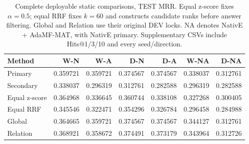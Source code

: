 \begin{table}[htbp]
\centering\footnotesize
\setlength{\tabcolsep}{4pt}
\caption{Complete deployable static comparisons, TEST MRR. Equal z-score fixes $\alpha=0.5$; equal RRF fixes $k=60$ and constructs candidate ranks before answer filtering. Global and Relation use their original DEV locks. NA denotes NativE + AdaMF-MAT, with NativE primary. Supplementary CSVs include Hits@1/3/10 and every seed/direction.}
\label{tab:matched-static}
\begin{tabular}{lrrrrrr}
\toprule
Method & W-N & W-A & D-N & D-A & W-NA & D-NA\\
\midrule
Primary & 0.359721 & 0.359721 & 0.374567 & 0.374567 & 0.338037 & 0.312761\\
Secondary & 0.338037 & 0.296319 & 0.312761 & 0.282588 & 0.296319 & 0.282588\\
Equal z-score & 0.364968 & 0.336645 & 0.360744 & 0.338108 & 0.327268 & 0.300405\\
Equal RRF & 0.345546 & 0.322471 & 0.354296 & 0.326784 & 0.296458 & 0.284988\\
Global & 0.364665 & 0.359721 & 0.374567 & 0.374567 & 0.344127 & 0.312761\\
Relation & 0.368921 & 0.358672 & 0.374491 & 0.373179 & 0.343964 & 0.312726\\
\bottomrule
\end{tabular}
\end{table}

